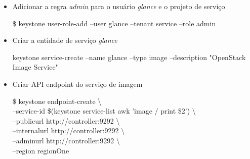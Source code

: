 \begin{enumerate}
\begin{itemize}
	
			\item Adicionar a regra \emph{admin}	para o usuário \emph{glance} e o projeto de serviço
				\begin{snugshade}	
					\$ keystone user-role-add --user glance --tenant service --role admin
				\end{snugshade}	

			\item Criar a entidade de serviço \emph{glance}
				\begin{snugshade}
						keystone service-create --name glance --type image --description "OpenStack Image Service"
				\end{snugshade}			
			
			
			\item Criar API endpoint do serviço de imagem
				\begin{snugshade}	
					\$ keystone endpoint-create \textbackslash \\
	  --service-id \$(keystone service-list \textbar awk '\textbar image / {print \$2}') \textbackslash \\
	  --publicurl http://controller:9292 \textbackslash \\
	  --internalurl http://controller:9292 \textbackslash \\
	  --adminurl http://controller:9292 \textbackslash \\
	  --region regionOne
				\end{snugshade}	
		\end{itemize}				
				
	\end{enumerate}
	
